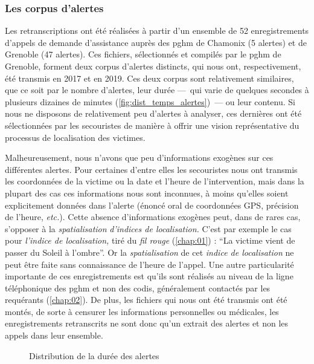 \subsubsection{Les corpus d'alertes}

Les retranscriptions ont été réalisées à partir d'un ensemble de 52
enregistrements d'appels de demande d'assistance auprès des \ac{pghm}
de Chamonix (5 alertes) et de Grenoble (47 alertes). Ces fichiers,
sélectionnés et compilés par le \ac{pghm} de Grenoble, forment deux
corpus d'alertes distincts, qui nous ont, respectivement, été transmis
en 2017 et en 2019. Ces deux corpus sont relativement similaires, que
ce soit par le nombre d'alertes, leur durée ---~qui varie de quelques
secondes à plusieurs dizaines de minutes
(\autoref{fig:dist_temps_alertes})~--- ou leur contenu. Si nous ne
disposons de relativement peu d'alertes à analyser, ces dernières ont
été sélectionnées par les secouristes de manière à offrir une vision
représentative du processus de localisation des victimes.

Malheureusement, nous n'avons que peu d'informations exogènes sur ces
différentes alertes. Pour certaines d'entre elles les secouristes nous
ont transmis les coordonnées de la victime ou la date et l'heure de
l'intervention, mais dans la plupart des cas ces informations nous
sont inconnues, à moins qu'elles soient explicitement données dans
l'alerte (\eg énoncé oral de coordonnées GPS, précision de l'heure,
\emph{etc.}). Cette absence d'informations exogènes peut, dans de
rares cas, s'opposer à la \emph{spatialisation} \emph{d'indices de
  localisation.} C'est par exemple le cas pour \emph{l'indice de
  localisation,} tiré du \emph{fil rouge} (\autoref{chap:01}) :
\enquote{La victime vient de passer du Soleil à l'ombre}. Or la
\emph{spatialisation} de cet \emph{indice de localisation} ne peut
être faite sans connaissance de l'heure de l'appel. Une autre
particularité importante de ces enregistrements est qu'ils sont
réalisés au niveau de la ligne téléphonique des \ac{pghm} et non des
\ac{codis}, généralement contactés par les requérants
(\autoref{chap:02}). De plus, les fichiers qui nous ont été transmis
ont été montés, de sorte à censurer les informations personnelles ou
médicales, les enregistrements retranscrits ne sont donc qu'un extrait
des alertes et non les appels dans leur ensemble.

\begin{figure}
  \centering
  
  \caption{Distribution de la durée des alertes}
  \label{fig:dist_temps_alertes}
\end{figure}

